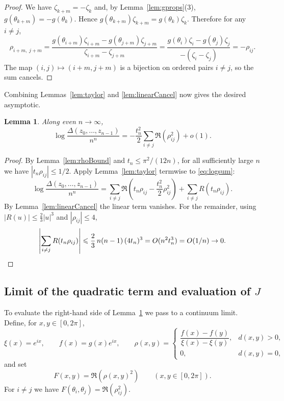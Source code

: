 \documentclass{article}
\newtheorem{lem}[thr]{Lemma}
\theoremstyle{definition}
\let\le\leqslant
\begin{document}
\begin{proof}
We have $\zeta_{k+m}=-\zeta_k$ and, by Lemma~\ref{lem:gprops}(3),
$g(\theta_{k+m})=-g(\theta_k)$. Hence $g(\theta_{k+m})\zeta_{k+m}=g(\theta_k)\zeta_k$. Therefore for any $i\neq j$,
\[
\rho_{i+m,\;j+m}
=
\frac{g(\theta_{i+m})\zeta_{i+m}-g(\theta_{j+m})\zeta_{j+m}}{\zeta_{i+m}-\zeta_{j+m}}
=
\frac{g(\theta_i)\zeta_i-g(\theta_j)\zeta_j}{-(\zeta_i-\zeta_j)}
=
-\rho_{ij}.
\]
The map $(i,j)\mapsto(i+m,j+m)$ is a bijection on ordered pairs $i\neq j$,
so the sum cancels.
\end{proof}

Combining Lemmas~\ref{lem:taylor} and \ref{lem:linearCancel} now gives the desired asymptotic.

\begin{lem}\label{lem:logAsym}
Along even $n\to\infty$,
\[
\log\frac{\Delta(z_0,\dots,z_{n-1})}{n^n}
=
-\frac{t_n^2}{2}\sum_{i\neq j}\Re(\rho_{ij}^2)+o(1).
\]
\end{lem}

\begin{proof}
By Lemma~\ref{lem:rhoBound} and $t_n\le \pi^2/(12n)$, for all sufficiently large $n$ we have
$|t_n\rho_{ij}|\le 1/2$. Apply Lemma~\ref{lem:taylor} termwise to \eqref{eq:logsum}:
\[
\log\frac{\Delta(z_0,\dots,z_{n-1})}{n^n}
=\sum_{i\neq j}\Re \left(t_n\rho_{ij}-\frac{t_n^2}{2}\rho_{ij}^2\right)
+\sum_{i\neq j}R(t_n\rho_{ij}).
\]
By Lemma~\ref{lem:linearCancel} the linear term vanishes. For the remainder,
using $|R(u)|\le \frac23|u|^3$ and $|\rho_{ij}|\le 4$,
\[
\left|\sum_{i\neq j}R(t_n\rho_{ij})\right|
\le \frac{2}{3}\,n(n-1)\,(4t_n)^3
=O(n^2 t_n^3)=O(1/n)\to0.
\qedhere
\]
\end{proof}

\subsection{Limit of the quadratic term and evaluation of $J$}
To evaluate the right-hand side of Lemma~\ref{lem:logAsym} we pass to a continuum limit.
Define, for $x,y\in[0,2\pi]$,
\begin{equation}\label{eq:def_riemann_sum_limit_for_ss_1}
\xi(x)=e^{ix},\qquad f(x)=g(x)e^{ix},\qquad
\rho(x,y)=
\begin{cases}
\dfrac{f(x)-f(y)}{\xi(x)-\xi(y)},& d(x,y)>0,\\[1.2ex]
0,& d(x,y)=0,
\end{cases}
\end{equation}
and set
\[
F(x,y)=\Re(\rho(x,y)^2)\qquad (x,y\in[0,2\pi]).
\]
For $i\neq j$ we have $F(\theta_i,\theta_j)=\Re(\rho_{ij}^2)$.
\end{document}

